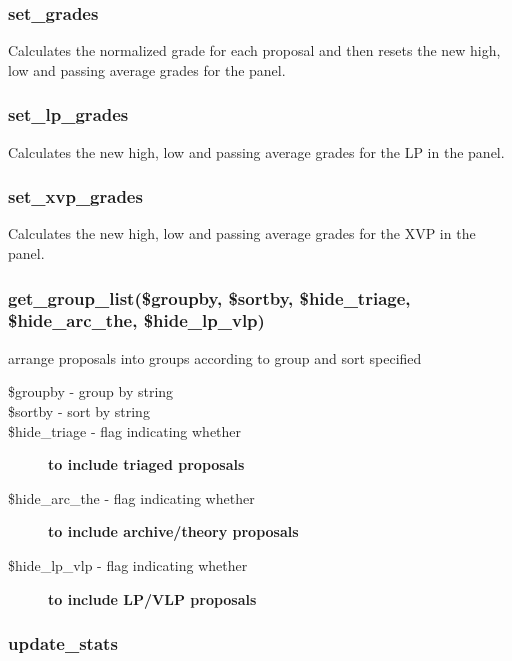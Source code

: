 \documentclass{article}
\begin{document}
\subsubsection*{set\_grades\label{Panel_set_grades}}


Calculates the normalized grade for each proposal and then resets the new 
high, low and passing average grades for the panel.

\subsubsection*{set\_lp\_grades\label{Panel_set_lp_grades}}


Calculates the new high, low and passing average grades for the LP in the panel.

\subsubsection*{set\_xvp\_grades\label{Panel_set_xvp_grades}}


Calculates the new high, low and passing average grades for the XVP in the panel.

\subsubsection*{get\_group\_list(\$groupby, \$sortby, \$hide\_triage, \$hide\_arc\_the, \$hide\_lp\_vlp)\label{Panel_get_group_list_groupby_sortby_hide_triage_hide_arc_the_hide_lp_vlp_}}


arrange proposals into groups according to group and sort specified

\begin{description}

\item[{\$groupby - group by string}] \mbox{}
\item[{\$sortby - sort by string}] \mbox{}
\item[{\$hide\_triage - flag indicating whether}] \textbf{to include triaged proposals}
\item[{\$hide\_arc\_the - flag indicating whether}] \textbf{to include archive/theory proposals}
\item[{\$hide\_lp\_vlp - flag indicating whether}] \textbf{to include LP/VLP proposals}\end{description}
\subsubsection*{update\_stats\label{Panel_update_stats}}
\end{document}
